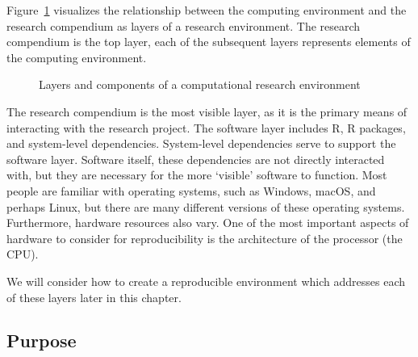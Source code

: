 \documentclass[
  letterpaper,
]{latex/krantz}
\theoremstyle{definition}
\theoremstyle{remark}
\begin{document}
Figure~\ref{fig-contr-ro-structure} visualizes the relationship between
the computing environment and the research compendium as layers of a
research environment. The research compendium is the top layer, each of
the subsequent layers represents elements of the computing environment.

\begin{figure}[H]


\caption{\label{fig-contr-ro-structure}Layers and components of a
computational research environment}

\end{figure}%

The research compendium is the most visible layer, as it is the primary
means of interacting with the research project. The software layer
includes R, R packages, and system-level dependencies. System-level
dependencies serve to support the software layer. Software itself, these
dependencies are not directly interacted with, but they are necessary
for the more `visible' software to function. Most people are familiar
with operating systems, such as Windows, macOS, and perhaps Linux, but
there are many different versions of these operating systems.
Furthermore, hardware resources also vary. One of the most important
aspects of hardware to consider for reproducibility is the architecture
of the processor (the CPU).

We will consider how to create a reproducible environment which
addresses each of these layers later in this chapter.

\subsection{Purpose}\label{sec-contr-ro-purpose}
\end{document}
